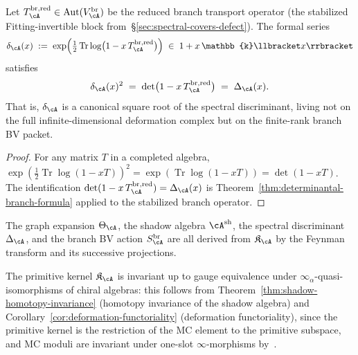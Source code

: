 \begin{corollary}
\label{cor:metaplectic-square-root}
\ClaimStatusProvedHere
{}
Let $T_\cA^{\mathrm{br,red}} \in
\operatorname{Aut}(V_\cA^{\mathrm{br}})$
be the reduced branch transport operator
\textup{(}the stabilized Fitting-invertible block
from~\S\textup{\ref{sec:spectral-covers-defect})}.
The formal series
\begin{equation}
\label{eq:metaplectic-half-density}
\delta_\cA(x)
\;:=\;
\exp\Bigl(
\tfrac{1}{2}\operatorname{Tr}\log\bigl(
1 - x\,T_\cA^{\mathrm{br,red}}
\bigr)
\Bigr)
\;\in\; 1 + x\,\mathbb{k}\llbracket x \rrbracket
\end{equation}
satisfies
\begin{equation}
\label{eq:metaplectic-squaring}
\delta_\cA(x)^2
\;=\;
\det\bigl(1 - x\,T_\cA^{\mathrm{br,red}}\bigr)
\;=\;
\Delta_\cA(x).
\end{equation}
That is, $\delta_\cA$ is a canonical square root of the
spectral discriminant, living not on the full infinite-dimensional
deformation complex but on the finite-rank branch BV packet.
\end{corollary}

\begin{proof}
For any matrix $T$ in a completed algebra,
$\exp(\frac{1}{2}\operatorname{Tr}\log(1-xT))^2
= \exp(\operatorname{Tr}\log(1-xT))
= \det(1-xT)$.
The identification $\det(1-x\,T_\cA^{\mathrm{br,red}}) = \Delta_\cA(x)$
is Theorem~\ref{thm:determinantal-branch-formula}
applied to the stabilized branch operator.
\end{proof}

\begin{remark}
\label{rem:primitive-kernel-native-object}
The graph expansion $\Theta_\cA$, the shadow algebra
$\cA^{\mathrm{sh}}$, the spectral discriminant $\Delta_\cA$,
and the branch BV action $S_\cA^{\mathrm{br}}$ are all derived
from $\mathfrak{K}_\cA$ by the Feynman transform and its
successive projections.
\end{remark}

\begin{remark}
\label{rem:primitive-kernel-homotopy-invariance}
The primitive kernel $\mathfrak{K}_\cA$ is invariant up to gauge
equivalence under $\infty_\alpha$-quasi-isomorphisms of chiral
algebras: this follows from
Theorem~\ref{thm:shadow-homotopy-invariance} (homotopy invariance
of the shadow algebra) and
Corollary~\ref{cor:deformation-functoriality} (deformation
functoriality), since the primitive kernel is the restriction of
the MC element to the primitive subspace, and MC moduli are
invariant under one-slot $\infty$-morphisms
by~\cite[\S8]{RNW19}.
\end{remark}

